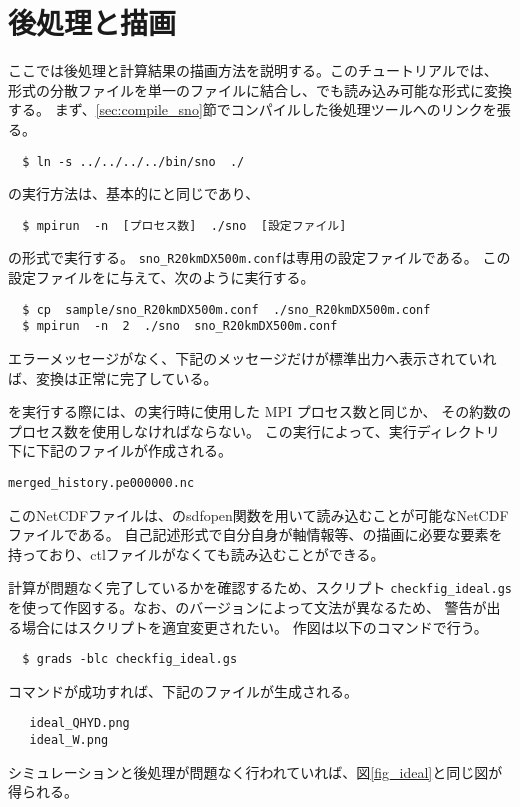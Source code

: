 \section{後処理と描画} \label{sec:ideal_exp_sno}
ここでは後処理と計算結果の描画方法を説明する。このチュートリアルでは、
{\netcdf}形式の分散ファイルを単一のファイルに結合し、\grads でも読み込み可能な{\netcdf}形式に変換する。
まず、\ref{sec:compile_sno}節でコンパイルした後処理ツール\sno へのリンクを張る。
\begin{verbatim}
  $ ln -s ../../../../bin/sno  ./
\end{verbatim}

\sno の実行方法は、基本的に{\scalerm}と同じであり、
\begin{verbatim}
  $ mpirun  -n  [プロセス数]  ./sno  [設定ファイル]
\end{verbatim}
の形式で実行する。
\verb|sno_R20kmDX500m.conf|は\sno 専用の設定ファイルである。
この設定ファイルを\sno に与えて、次のように実行する。
\begin{verbatim}
  $ cp  sample/sno_R20kmDX500m.conf  ./sno_R20kmDX500m.conf
  $ mpirun  -n  2  ./sno  sno_R20kmDX500m.conf
\end{verbatim}
エラーメッセージがなく、下記のメッセージだけが標準出力へ表示されていれば、変換は正常に完了している。

\sno を実行する際には、{\scalerm}の実行時に使用した MPI プロセス数と同じか、
その約数のプロセス数を使用しなければならない。
この実行によって、実行ディレクトリ下に下記のファイルが作成される。
\begin{alltt}
  merged_history.pe000000.nc
\end{alltt}
このNetCDFファイルは、\grads のsdfopen関数を用いて読み込むことが可能なNetCDFファイルである。
自己記述形式で自分自身が軸情報等、\grads の描画に必要な要素を持っており、ctlファイルがなくても読み込むことができる。

計算が問題なく完了しているかを確認するため、\grads スクリプト \verb|checkfig_ideal.gs|
を使って作図する。なお、\grads のバージョンによって文法が異なるため、
警告が出る場合には\grads スクリプトを適宜変更されたい。
作図は以下のコマンドで行う。
\begin{verbatim}
  $ grads -blc checkfig_ideal.gs
\end{verbatim}
コマンドが成功すれば、下記のファイルが生成される。
\begin{verbatim}
   ideal_QHYD.png
   ideal_W.png
\end{verbatim}
シミュレーションと後処理が問題なく行われていれば、図\ref{fig_ideal}と同じ図が得られる。


